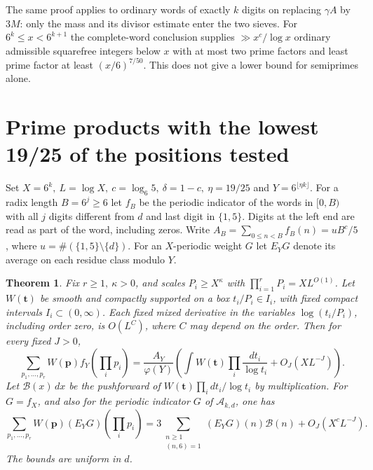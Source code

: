 \documentclass[11pt,a4paper]{article}
\theoremstyle{paperplain}
\newtheorem{theorem}{Theorem}[section]
\numberwithin{equation}{section}
\begin{document}
The same proof applies to ordinary words of exactly $k$ digits on replacing
$\gamma A$ by $3M$: only the mass and its divisor estimate enter the two
sieves. For $6^k\le x<6^{k+1}$ the complete-word conclusion supplies
$\gg x^c/\log x$ ordinary admissible squarefree integers below $x$ with
at most two prime factors and least prime factor at least $(x/6)^{7/50}$.
This does not give a lower bound for semiprimes alone.

\section{Prime products with the lowest 19/25 of the positions tested}
\label{six:sec-six-projection}
Set \(X=6^k,\ L=\log X,\ c=\log_6 5,\ \delta=1-c,\ \eta=19/25\)
and \(Y=6^{\lfloor\eta k\rfloor}\). For a radix length \(B=6^j\ge6\)
let \(f_B\) be the periodic indicator of the words in \([0,B)\)
with all \(j\) digits different from \(d\) and last digit in \(\{1,5\}\).
Digits at the left end are read as part of the word, including zeros.
Write \(A_B=\sum_{0\le n<B}f_B(n)=uB^c/5\), where
\(u=\#(\{1,5\}\setminus\{d\})\). For an \(X\)-periodic weight \(G\)
let \(E_YG\) denote its average on each residue class modulo \(Y\).

\begin{theorem}\label{six:thm-six-low-projection}
Fix \(r\ge1,\ \kappa>0\), and scales \(P_i\ge X^\kappa\)
with \(\prod_{i=1}^rP_i=XL^{O(1)}\). Let \(W(\boldsymbol t)\) be
smooth and compactly supported on a box \(t_i/P_i\in I_i\), with
fixed compact intervals \(I_i\subset(0,\infty)\). Each fixed mixed
derivative in the variables \(\log(t_i/P_i)\), including order zero,
is \(O(L^{C})\), where \(C\) may depend on the order. Then for every
fixed \(J>0\),
\begin{equation}\label{six:eq-six-low-principal}
 \sum_{p_1,\ldots,p_r} W(\boldsymbol p)f_Y(\textstyle\prod_i p_i)
 =\frac{A_Y}{\varphi(Y)}
  \left(\int W(\boldsymbol t)\prod_i\frac{dt_i}{\log t_i}
             +O_J(XL^{-J})\right).
\end{equation}
Let \(\mathcal B(x)\,dx\) be the pushforward of
\(W(\boldsymbol t)\prod_i dt_i/\log t_i\) by multiplication.
For \(G=f_X\), and also for the periodic indicator \(G\) of
\(\mathcal A_{k,d}\), one has
\begin{equation}\label{six:eq-six-low-model}
 \sum_{p_1,\ldots,p_r} W(\boldsymbol p)(E_YG)(\textstyle\prod_i p_i)
 =3\sum_{\substack{n\ge1\\(n,6)=1}}(E_YG)(n)\mathcal B(n)
       +O_J(X^cL^{-J}).
\end{equation}
The bounds are uniform in \(d\).
\end{theorem}
\end{document}
